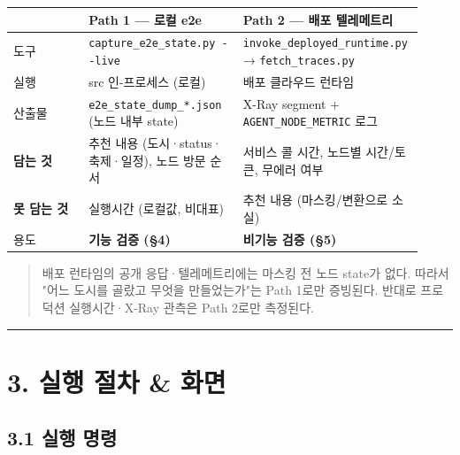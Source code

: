 \documentclass[11pt,a4paper]{article}
\newcommand{\DocNeedspace}[1]{\par\ifdim\dimexpr\pagegoal-\pagetotal\relax<#1\newpage\fi}
\begin{document}
\begin{small}
\begin{longtable}{@{}>{\RaggedRight\arraybackslash}m{0.180\linewidth}>{\RaggedRight\arraybackslash}m{0.340\linewidth}>{\RaggedRight\arraybackslash}m{0.400\linewidth}@{}}
\toprule\noalign{}
& Path 1 --- 로컬 e2e & Path 2 --- 배포 텔레메트리 \\
\midrule\noalign{}
\endhead
\bottomrule\noalign{}
\endlastfoot
도구 & \texttt{capture\_\allowbreak{}e2e\_\allowbreak{}state.\allowbreak{}py\ -\allowbreak{}\/\allowbreak{}-\allowbreak{}live} & \texttt{invoke\_\allowbreak{}deployed\_\allowbreak{}runtime.\allowbreak{}py} → \texttt{fetch\_\allowbreak{}traces.\allowbreak{}py} \\
실행 & src 인-프로세스 (로컬) & 배포 클라우드 런타임 \\
산출물 & \texttt{e2e\_\allowbreak{}state\_\allowbreak{}dump\_\allowbreak{}*.\allowbreak{}json} (노드 내부 state) & X-Ray segment + \texttt{AGENT\_\allowbreak{}NODE\_\allowbreak{}METRIC} 로그 \\
\textbf{담는 것} & 추천 내용 (도시·status·축제·일정), 노드 방문 순서 & 서비스 콜 시간, 노드별 시간/토큰, 무에러 여부 \\
\textbf{못 담는 것} & 실행시간 (로컬값, 비대표) & 추천 내용 (마스킹/변환으로 소실) \\
용도 & \textbf{기능 검증 (§4)} & \textbf{비기능 검증 (§5)} \\
\end{longtable}
\end{small}

\begin{quote}
배포 런타임의 공개 응답·텔레메트리에는 마스킹 전 노드 state가 없다. 따라서 "어느 도시를 골랐고 무엇을 만들었는가"는 Path 1로만 증빙된다. 반대로 프로덕션 실행시간·X-Ray 관측은 Path 2로만 측정된다.
\end{quote}

\begin{center}\rule{0.5\linewidth}{0.5pt}\end{center}

\newpage
\DocNeedspace{8\baselineskip}
\section*{3. 실행 절차 \& 화면}

\DocNeedspace{6\baselineskip}
\subsection*{3.1 실행 명령}
\end{document}
